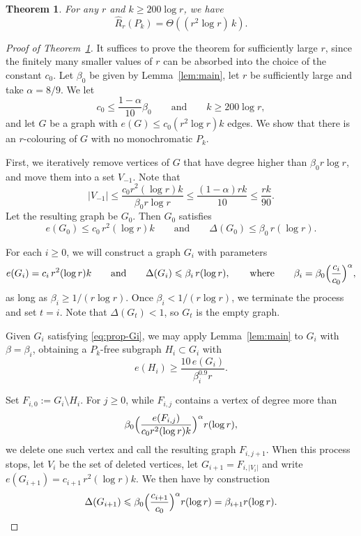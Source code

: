 \documentclass[10pt,a4paper]{amsart}
\newtheorem{theorem}{Theorem}
\renewcommand{\ge}{\geqslant}
\renewcommand{\geq}{\ge}
\renewcommand{\le}{\leqslant}
\renewcommand{\leq}{\le}
\begin{document}
\begin{theorem}\label{thm:main}
    For any $r$ and $k \geq 200\log r$, we have 
    $$\widehat{R}_r(P_k)=\Theta\left((r^2 \log r) \,k\right).$$  
\end{theorem} 

\begin{proof}[Proof of Theorem~\ref{thm:main}] It suffices to prove the theorem for sufficiently large $r$, since the finitely many smaller values of $r$ can be absorbed into the choice of the constant $c_0$. Let $\beta_0$ be given by Lemma~\ref{lem:main}, let $r$ be sufficiently large  and take $\alpha=8/9$. We let
\[ c_0 \leq  \frac{1-\alpha}{10}\beta_0 \qquad \text{and} \qquad k \geq 200\log r,\]
and let $G$ be a graph with $e(G)\leq c_0(r^2\log r)k$ edges. We show that there is an $r$-colouring of $G$ with no monochromatic $P_k$.

First, we iteratively remove vertices of $G$ that have degree higher than $\beta_0r\log r$, and move them into a set $V_{-1}$. Note that
\[|V_{-1}|\leq\frac{c_0r^2(\log r)k}{\beta_0r\log r}\leq \frac{(1-\alpha)rk}{10}\leq \frac{rk}{90}.\]
Let the resulting graph be $G_0$. Then $G_0$ satisfies
\[e(G_0)\leq c_0\, r^2(\log r)k\qquad\text{and}\qquad
\Delta(G_0)\leq \beta_0\, r(\log r).\]

For each $i\geq 0$, we will construct a graph $G_i$ with parameters
\begin{equation}\label{eq:prop-Gi} e(G_i)=c_i\, r^2(\log r)k
\qquad\text{and}\qquad
\Delta(G_i)\leq \beta_i\, r(\log r), \qquad\text{where}\qquad \beta_i=\beta_0\Bigl(\frac{c_i}{c_0}\Bigr)^\alpha,\end{equation}
as long as $\beta_i\geq1/(r\log r)$. Once $\beta_i<1/(r\log r)$, we terminate the process and set $t=i$. Note that $\Delta(G_t)<1$, so $G_t$ is the empty graph.

Given $G_i$ satisfying \eqref{eq:prop-Gi}, we may apply Lemma~\ref{lem:main} to $G_i$ with $\beta=\beta_i$, obtaining a $P_k$-free subgraph $H_i\subset G_i$ with
\[e(H_i)\geq \frac{10\,e(G_i)}{\beta_i^{0.9}r}.\]

Set $F_{i,0}:=G_i\setminus H_i$. For $j\geq 0$, while $F_{i,j}$ contains a vertex of degree more than
\[\beta_0\Bigl(\frac{e(F_{i,j})}{c_0 r^2(\log r)k}\Bigr)^\alpha r(\log r),\]
we delete one such vertex and call the resulting graph $F_{i,j+1}$.
When this process stops, let $V_i$ be the set of deleted vertices, let $G_{i+1}=F_{i,|V_i|}$ and write $e(G_{i+1})=c_{i+1}\,r^2(\log r)k$. We
 then have by construction
\[\Delta(G_{i+1})\leq \beta_0\Bigl(\frac{c_{i+1}}{c_0}\Bigr)^\alpha r(\log r)
=\beta_{i+1}r(\log r).\]


\end{proof}
\end{document}
